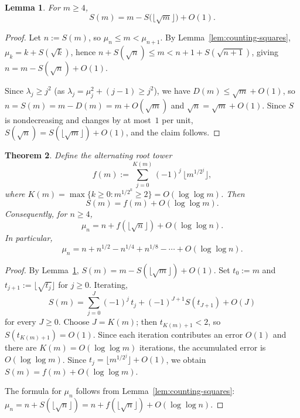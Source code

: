 \documentclass[11pt]{article}
\numberwithin{equation}{section}
\theoremstyle{plain}
\newtheorem{theorem}{Theorem}[section]
\newtheorem{lemma}[theorem]{Lemma}
\theoremstyle{definition}
\theoremstyle{remark}
\begin{document}
\begin{lemma}\label{lem:S-renorm-rigorous}
For $m\ge4$,
\[
  S(m) = m - S\!\bigl(\lfloor\sqrt{m}\rfloor\bigr) + O(1).
\]
\end{lemma}

\begin{proof}
Let $n:=S(m)$, so $\mu_n\le m<\mu_{n+1}$.
By Lemma~\ref{lem:counting-squares}, $\mu_k = k + S(\sqrt{k})$, hence
$n + S(\sqrt{n}) \le m < n+1+S(\sqrt{n+1})$, giving
$n = m - S(\sqrt{n}) + O(1)$.

Since $\lambda_j\ge j^2$ (as $\lambda_j=\mu_j^2+(j-1)\ge j^2$), we have
$D(m)\le\sqrt{m}+O(1)$, so $n=S(m)=m-D(m)=m+O(\sqrt{m})$ and
$\sqrt{n}=\sqrt{m}+O(1)$.  Since $S$ is nondecreasing and changes by at most~$1$
per unit, $S(\sqrt{n})=S(\lfloor\sqrt{m}\rfloor)+O(1)$, and the claim follows.
\end{proof}

\begin{theorem}\label{thm:squares-asymp}
Define the \emph{alternating root tower}
\begin{equation}\label{eq:root-tower}
  f(m) := \sum_{j=0}^{K(m)} (-1)^j\, \lfloor m^{1/2^j}\rfloor,
\end{equation}
where $K(m)=\max\{k\ge0:m^{1/2^k}\ge2\}=O(\log\log m)$.
Then
\[
  S(m) = f(m) + O(\log\log m).
\]
Consequently, for $n\ge4$,
\begin{equation}\label{eq:mu-tower}
  \mu_n = n + f(\lfloor\sqrt{n}\rfloor) + O(\log\log n).
\end{equation}
In particular,
\[
  \mu_n = n + n^{1/2} - n^{1/4} + n^{1/8} - \cdots + O(\log\log n).
\]
\end{theorem}

\begin{proof}
By Lemma~\ref{lem:S-renorm-rigorous}, $S(m) = m - S(\lfloor\sqrt{m}\rfloor)+O(1)$.
Set $t_0:=m$ and $t_{j+1}:=\lfloor\sqrt{t_j}\rfloor$ for $j\ge0$.  Iterating,
\[
  S(m) = \sum_{j=0}^{J}(-1)^j\,t_j + (-1)^{J+1}S(t_{J+1}) + O(J)
\]
for every $J\ge0$.  Choose $J=K(m)$; then $t_{K(m)+1}<2$, so
$S(t_{K(m)+1})=O(1)$.  Since each iteration contributes an error $O(1)$ and
there are $K(m)=O(\log\log m)$ iterations, the accumulated error is
$O(\log\log m)$.  Since $t_j=\lfloor m^{1/2^j}\rfloor+O(1)$, we obtain
$S(m) = f(m)+O(\log\log m)$.

The formula for $\mu_n$ follows from Lemma~\ref{lem:counting-squares}:
$\mu_n = n + S(\lfloor\sqrt{n}\rfloor) = n + f(\lfloor\sqrt{n}\rfloor) + O(\log\log n)$.
\end{proof}
\end{document}
